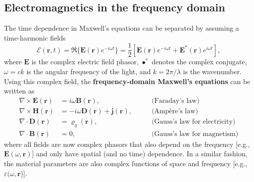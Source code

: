 \subsection*{Electromagnetics in the frequency domain}

The time dependence in Maxwell's equations can be separated by assuming a
time-harmonic fields
\begin{equation}
 \bm{\mathcal{E}}(\mathbf{r}, t) = \Re \{ \mathbf{E}(\mathbf{r}) e^{-i\omega
 t} \}= \frac{1}{2}\left[ \mathbf{E}(\mathbf{r}) e^{-i\omega t} +
 \mathbf{E}^*(\mathbf{r}) e^{i\omega t}\right],
\end{equation}
where $\mathbf{E}$ is the complex electric field phasor, $\bullet^*$ denotes the complex conjugate, $\omega=ck$ is the angular
frequency of the light, and $k=2\pi/\lambda$ is the wavenumber.
Using this complex field, the \textbf{frequency-domain Maxwell's equations} can be written as
\begin{align}
    \nabla \times \mathbf{E}(\mathbf{r}) & = i\omega \mathbf{B}(\mathbf{r}),
 \quad \quad                          & \text{(Faraday's law)} \label{eq:curlE_freq}                                   \\
    \nabla \times \mathbf{H}(\mathbf{r}) & = -i\omega \mathbf{D}(\mathbf{r}) +
 \mathbf{j}(\mathbf{r}), \quad \quad  & \text{(Ampère's law)}
    \label{eq:curlH_freq}                                                                                                 \\
    \nabla \cdot \mathbf{D}(\mathbf{r})  & = \varrho_q(\mathbf{r}), \quad \quad
                                         & \text{(Gauss's law for electricity)} \label{eq:divD_freq}                      \\
    \nabla \cdot \mathbf{B}(\mathbf{r})  & = 0, \quad \quad                                          & \text{(Gauss's law
 for magnetism)} \label{eq:divB_freq}
\end{align}
where all fields are now complex phasors that also depend on the frequency
[e.g., $\mathbf{E}(\omega, \mathbf{r})$] and only have spatial (and no time) dependence. In a
similar fashion,
the material parameters are also complex functions of space and frequency [e.g.,
$\varepsilon(\omega, \mathbf{r}$)].

